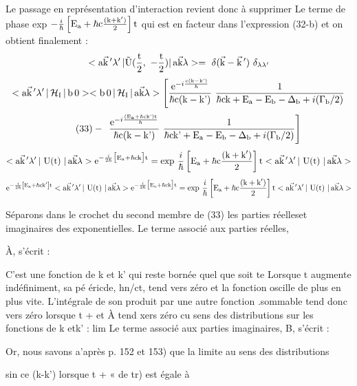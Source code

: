 Le passage en représentation d'interaction revient donc à supprimer Le terme
de phase exp $-\frac{i}{\hbar}\left[\text{E}_{\text{a}}+\hbar\text{c}\frac{\text{(k}+\text{k}')}{2}\right]\text{t}$ 
qui est en facteur dans l'expression (32-b)
et on obtient finalement :
\[
<\mt{a}\vec{\mt{k}}\,'\lambda'\,|\tilde{\mt{U}}(\frac{\mt{t}}{2},\ -\frac{\mt{t}}{2})|\,\mt{a}\vec{\mt{k}}\lambda>=
\ \delta(\vec{\mt{k}}-\vec{\mt{k}}\,')\ \delta_{\lambda\lambda'}
\]
\[
<\mt{a}\vec{\mt{k}}\,'\lambda'\,|\,\mc{H}_\mt{I}\,|\,\mt{b}\,0 >
<\mt{b}\,0\,|\,\mc{H}_\mt{I}\,|\,\mt{a}\vec{\mt{k}}\lambda>\left[
\frac{\mt{e}^{-i\frac{\mt{c(k}-\mt{k')}}{\hbar}}}{\hbar\mt{c(k}-\mt{k')}}
\ \frac{1}{\hbar\mt{ck}+\mt{E}_\mt{a}-\mt{E}_\mt{b}-\Delta_\mt{b}+i(\Gamma_\mt{b}/2)}
\right .
\]
\[
\tag{33}-\ \left.
\frac{\mt{e}^{-i\frac{(\mt{E}_\mt{a}+\hbar\mt{ck')t}}{\hbar}}}{\hbar\mt{c(k}-\mt{k')}}
\ \frac{1}{\hbar\mt{ck'}+\mt{E}_\mt{a}-\mt{E}_\mt{b}-\Delta_\mt{b}+i(\Gamma_\mt{b}/2)}
\right]
\]
\[
<\text{a}\vec{\text{k}}\,'\lambda'\,|\text{ U}(\text{t) }|\,\text{a}\vec{\text{k}}\lambda>
\text{e}^{-\frac{i}{2\hbar}\big[\text{E}_{\text{a}}+\hbar\text{ck}\big]\text{t}}
=\text{exp }\frac{i}{\hbar}\left[\text{E}_{\text{a}}+\hbar\text{c}\frac{\text{(k}+\text{k}')}{2}\right]\text{t}
<\text{a}\vec{\text{k}}\,'\lambda'\,|\text{ U}(\text{t) }|\,\text{a}\vec{\text{k}}\lambda>
\]
\[
\text{e}^{-\frac{i}{2\hbar}\left[\text{E}_{\text{a}}+\hbar\text{ck}'\right]\text{t}}
<\text{a}\vec{\text{k}}\,'\lambda'\,|\text{ U}(\text{t) }|\,\text{a}\vec{\text{k}}\lambda>
\text{e}^{-\frac{i}{2\hbar}\big[\text{E}_{\text{a}}+\hbar\text{ck}\big]\text{t}}
=\text{exp }\frac{i}{\hbar}\left[\text{E}_{\text{a}}+\hbar\text{c}\frac{\text{(k}+\text{k}')}{2}\right]\text{t}
<\text{a}\vec{\text{k}}\,'\lambda'\,|\text{ U}(\text{t) }|\,\text{a}\vec{\text{k}}\lambda>
\]



Séparons dans le crochet du second membre de (33) les parties
réelleset imaginaires des exponentielles. Le terme associé aux parties réelles,

À, s'écrit :


C'est une fonction de k et k' qui reste bornée quel que soit te
Lorsque t augmente indéfiniment, sa pé éricde, hn/ct, tend vers zéro et la fonction oscille de plus en plus vite. L'intégrale de son produit par une autre
fonction .sommable tend donc vers zéro lorsque t + et À tend xers zéro cu
sens des distributions sur les fonctions de k etk' :
 lim
Le terme associé aux parties imaginaires, B, s'écrit :

Or, nous savons a'après p. 152 et 153) que la limite au sens des distributions

sin ce (k-k') 
lorsque t + « de tr) est égale à 

